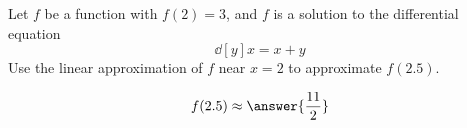 \documentclass{ximera}
\author{Steven Gubkin}
\begin{document}
\begin{exercise}



Let $f$ be a function with $f(2) = 3$, and $f$ is a solution to the
differential equation
\[
\dd[y]{x} = x+y
\]
Use the linear approximation of $f$ near $x=2$ to approximate $f(2.5)$. 
\begin{prompt}
  \[
  f(2.5) \approx \answer{\frac{11}{2}}
  \]
\end{prompt}

\end{exercise}
\end{document}
